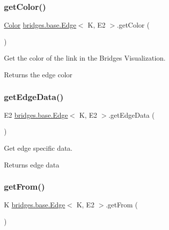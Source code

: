 \subsubsection{\texorpdfstring{get\+Color()}{getColor()}}
{\footnotesize\ttfamily \hyperlink{classbridges_1_1base_1_1_color}{Color} \hyperlink{classbridges_1_1base_1_1_edge}{bridges.\+base.\+Edge}$<$ K, E2 $>$.get\+Color (\begin{DoxyParamCaption}{ }\end{DoxyParamCaption})}



Get the color of the link in the Bridges Visualization. 

\begin{DoxyReturn}{Returns}
the edge color 
\end{DoxyReturn}
\mbox{\label{classbridges_1_1base_1_1_edge_a19a623d647eb17b7e53f1360577b0703}} 
\subsubsection{\texorpdfstring{get\+Edge\+Data()}{getEdgeData()}}
{\footnotesize\ttfamily E2 \hyperlink{classbridges_1_1base_1_1_edge}{bridges.\+base.\+Edge}$<$ K, E2 $>$.get\+Edge\+Data (\begin{DoxyParamCaption}{ }\end{DoxyParamCaption})}

Get edge specific data.

\begin{DoxyReturn}{Returns}
edge data 
\end{DoxyReturn}
\mbox{\label{classbridges_1_1base_1_1_edge_afc23a7c2ee8ab4c4f0950c9bf25edd56}} 
\subsubsection{\texorpdfstring{get\+From()}{getFrom()}}
{\footnotesize\ttfamily K \hyperlink{classbridges_1_1base_1_1_edge}{bridges.\+base.\+Edge}$<$ K, E2 $>$.get\+From (\begin{DoxyParamCaption}{ }\end{DoxyParamCaption})}

